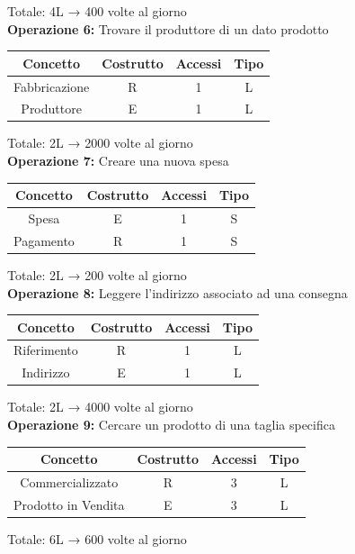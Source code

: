 \documentclass[a4paper,12pt]{report}
\begin{document}
Totale: 4L → 400 volte al giorno\\
\textbf{Operazione 6:}
Trovare il produttore di un dato prodotto\\
\begin{center}
    \begin{tabular}{ | c   c   c   c | } 
    \hline
	Concetto&Costrutto&Accessi&Tipo\\
	\hline
	Fabbricazione&R&1&L\\
	\hline
    Produttore&E&1&L\\
	\hline
	\end{tabular}
\end{center}
Totale: 2L → 2000 volte al giorno\\
\textbf{Operazione 7:}
Creare una nuova spesa\\
\begin{center}
    \begin{tabular}{ | c   c   c   c | } 
    \hline
	Concetto&Costrutto&Accessi&Tipo\\
	\hline
	Spesa&E&1&S\\
	\hline
	Pagamento&R&1&S\\
	\hline
	\end{tabular}
\end{center}
Totale: 2L → 200 volte al giorno\\
\textbf{Operazione 8:}
Leggere l'indirizzo associato ad una consegna\\
\begin{center}
    \begin{tabular}{ | c   c   c   c | } 
    \hline
	Concetto&Costrutto&Accessi&Tipo\\
	\hline
	Riferimento&R&1&L\\
	\hline
    Indirizzo&E&1&L\\
	\hline
	\end{tabular}
\end{center}
Totale: 2L → 4000 volte al giorno\\
\textbf{Operazione 9:}
Cercare un prodotto di una taglia specifica\\
\begin{center}
    \begin{tabular}{ | c   c   c   c | } 
    \hline
	Concetto&Costrutto&Accessi&Tipo\\
	\hline
	Commercializzato&R&3&L\\
	\hline
    Prodotto in Vendita&E&3&L\\
	\hline
	\end{tabular}
\end{center}
Totale: 6L → 600 volte al giorno\\
\end{document}
